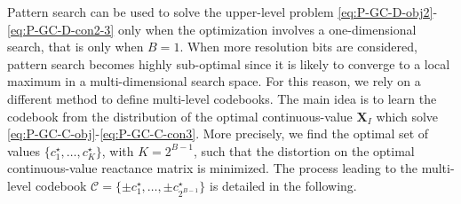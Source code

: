 \documentclass[twocolumn,10pt]{IEEEtran}
\begin{document}
Pattern search can be used to solve the upper-level problem \eqref{eq:P-GC-D-obj2}-\eqref{eq:P-GC-D-con2-3} only when the optimization involves a one-dimensional search, that is only when $B=1$.
When more resolution bits are considered, pattern search becomes highly sub-optimal since it is likely to converge to a local maximum in a multi-dimensional search space.
For this reason, we rely on a different method to define multi-level codebooks.
The main idea is to learn the codebook from the distribution of the optimal continuous-value $\mathbf{X}_{I}$ which solve \eqref{eq:P-GC-C-obj}-\eqref{eq:P-GC-C-con3}.
More precisely, we find the optimal set of values $\{c_1^\star,\ldots,c_K^\star\}$, with $K=2^{B-1}$, such that the distortion on the optimal continuous-value reactance matrix is minimized.
The process leading to the multi-level codebook $\mathcal{C}=\{\pm c_1^\star,\ldots,\pm c_{2^{B-1}}^\star\}$ is detailed in the following.
\end{document}
